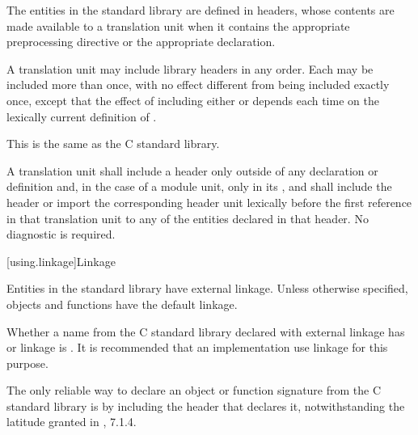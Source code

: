 \pnum
The entities in the \Cpp{} standard library are defined in headers,
whose contents are made available to a translation unit when it contains the appropriate
%
%
preprocessing directive
or the appropriate
%
 declaration.

\pnum
A translation unit may include library headers in any order.
%
Each may be included more than once, with no effect different from
being included exactly once, except that the effect of including either
 or 
depends each time on the lexically current definition of
%
%
.
\begin{footnote}
This is the same as the C standard library.
\end{footnote}

\pnum
A translation unit shall include a header only outside of any
%
declaration or definition and,
in the case of a module unit,
only in its , and
shall include the header or import the corresponding header unit lexically
before the first reference in that translation unit to any of the entities
declared in that header. No diagnostic is required.

[using.linkage]{Linkage}

\pnum
Entities in the \Cpp{} standard library have external linkage.
Unless otherwise specified, objects and functions have the default
linkage.

\pnum
{}%
Whether a name from the C standard library declared with
external linkage has
%
%
%
or
%
linkage is . It is recommended that an
implementation use
linkage for this purpose.
\begin{footnote}
The only reliable way to declare an object or
function signature from the C standard library is by including the header that
declares it, notwithstanding the latitude granted in \IsoC{}, 7.1.4.
\end{footnote}

